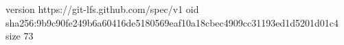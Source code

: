 version https://git-lfs.github.com/spec/v1
oid sha256:9b9c90fe249b6a60416de5180569eaf10a18cbec4909cc31193ed1d5201d01c4
size 73
